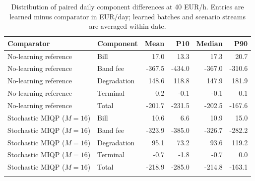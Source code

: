 \begin{table}[ht]
\centering
\small
\caption{Distribution of paired daily component differences at 40 EUR/h. Entries are learned minus comparator in EUR/day; learned batches and scenario streams are averaged within date.}
\label{tab:supp-round2-component-distribution}
\begin{tabular}{llrrrr}
\toprule
Comparator & Component & Mean & P10 & Median & P90 \\
\midrule
No-learning reference & Bill & 17.0 & 13.3 & 17.3 & 20.7 \\
No-learning reference & Band fee & -367.5 & -434.0 & -367.0 & -310.6 \\
No-learning reference & Degradation & 148.6 & 118.8 & 147.9 & 181.9 \\
No-learning reference & Terminal & 0.2 & -0.1 & -0.1 & 0.1 \\
No-learning reference & Total & -201.7 & -231.5 & -202.5 & -167.6 \\
\addlinespace
Stochastic MIQP ($M=16$) & Bill & 10.6 & 6.6 & 10.9 & 15.0 \\
Stochastic MIQP ($M=16$) & Band fee & -323.9 & -385.0 & -326.7 & -282.2 \\
Stochastic MIQP ($M=16$) & Degradation & 95.1 & 73.2 & 93.6 & 119.2 \\
Stochastic MIQP ($M=16$) & Terminal & -0.7 & -1.8 & -0.7 & 0.0 \\
Stochastic MIQP ($M=16$) & Total & -218.9 & -285.0 & -214.8 & -163.1 \\
\addlinespace
\bottomrule
\end{tabular}
\end{table}
